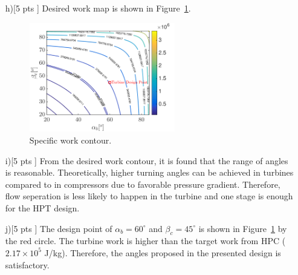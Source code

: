 \documentclass[12pt]{article}
\begin{document}
\begin{itemize}
	\item[h)[5 pts]]
	Desired work map is shown in Figure~\ref{fig:p2h}.
	\begin{figure}[H]
		\centering
		\includegraphics[width=0.6\textwidth]{p2h}
		\caption{Specific work contour.}
		\label{fig:p2h}
	\end{figure}
	
	\item[i)[5 pts]]
	From the desired work contour, it is found that the range of angles is reasonable. Theoretically, higher turning angles can be achieved in turbines compared to in compressors due to favorable pressure gradient. Therefore, flow seperation is less likely to happen in the turbine and one stage is enough for the HPT design.
	
	\item[j)[5 pts]]
	The design point of $\alpha_b = 60^\circ$ and $\beta_c = 45^\circ$ is shown in Figure~\ref{fig:p2h} by the red circle. The turbine work is higher than the target work from HPC ($2.17\times 10^5$ J/kg). Therefore, the angles proposed in the presented design is satisfactory.
	
\end{itemize}

\end{document}

